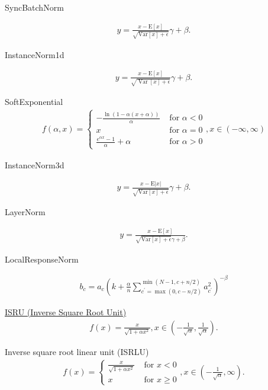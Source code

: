 SyncBatchNorm

\begin{align}
    y=\frac{x-\mathrm{E}[x]}{\sqrt{\mathrm{Var}[x]+\epsilon}}  \gamma+\beta.
\end{align}

InstanceNorm1d

\begin{align}
    y=\frac{x-\mathrm{E}[x]}{\sqrt{\operatorname{Var}[x]+\epsilon}}  \gamma+\beta.
\end{align}

SoftExponential
\begin{align}
  f(\alpha, x)=\left\{\begin{array}{ll}
{-\frac{\ln (1-\alpha(x+\alpha))}{\alpha}} & {\text { for } \alpha<0} \\
{x} & {\text { for } \alpha=0} \\
{\frac{e^{\alpha x}-1}{\alpha}+\alpha} & {\text { for } \alpha>0}
\end{array}\right., x\in (-\infty, \infty)
\end{align}

InstanceNorm3d

\begin{align}
    y=\frac{x-\mathrm{E}|x|}{\sqrt{\mathrm{Var}[x]+\epsilon}}  \gamma+\beta.
\end{align}

LayerNorm

\begin{align}
    y=\frac{x-\mathrm{E}[x]}{\sqrt{\mathrm{Var}[x]+\epsilon}  \gamma+\beta}.
\end{align}

LocalResponseNorm

\begin{align}
  b_{c}=a_{c}\left(k+\frac{\alpha}{n} \sum_{c^{\prime}=\max (0, c-n / 2)}^{\min (N-1, c+n / 2)} a_{c^{\prime}}^{2}\right)^{-\beta}
\end{align}

\href{http://www.gabormelli.com/RKB/Inverse_Square_Root_Unit_(ISRU)_Activation_Function}{ISRU (Inverse Square Root Unit)} \cite{BradCarlile2017}
\begin{align}
    f(x)=\frac{x}{\sqrt{1+\alpha x^{2}}}, x\in \left(-\frac{1}{\sqrt{\alpha}}, \frac{1}{\sqrt{\alpha}}\right).
\end{align}

Inverse square root linear unit (ISRLU) \cite{BradCarlile2017}
\begin{align}
f(x)=\left\{\begin{array}{ll}
{\frac{x}{\sqrt{1+\alpha x^{2}}}} & {\text { for } x<0} \\
{x} & {\text { for } x \geq 0}
\end{array}\right., x\in \left(-\frac{1}{\sqrt{\alpha}}, \infty\right).
\end{align}

